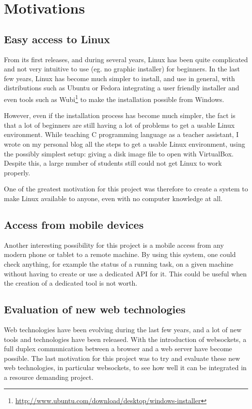 \section{Motivations}
\subsection{Easy access to Linux}
From its first releases, and during several years, Linux has been quite 
complicated and not very intuitive to use (eg. no graphic installer) for beginners.
In the last few years, Linux has become much simpler to install, and use in general, 
with distributions such as Ubuntu or Fedora integrating a user friendly installer 
and even tools such as Wubi\footnote{\url{http://www.ubuntu.com/download/desktop/windows-installer}}
to make the installation possible from Windows.

However, even if the installation process has become much simpler, the fact is that 
a lot of beginners are still having a lot of problems to get a usable Linux environment. 
While teaching C programming language as a teacher assistant, I wrote 
on my personal blog all the steps to get a usable Linux environment, using the 
possibly simplest setup: giving a disk image file to open with VirtualBox. 
Despite this, a large number of students still could not get Linux to work properly.

One of the greatest motivation for this project was therefore to create a system to 
make Linux available to anyone, even with no computer knowledge at all.
%
\subsection{Access from mobile devices}
Another interesting possibility for this project is a mobile access from any modern 
phone or tablet to a remote machine. By using this system, one could check anything,
for example the status of a running task,  on a given machine without having 
to create or use a dedicated API for it. This could be useful when the creation of 
a dedicated tool is not worth.
%
\subsection{Evaluation of new web technologies }
Web technologies have been evolving during the last few years, and a lot 
of new tools and technologies have been released. With the introduction of
websockets, a full duplex communication between a browser and a web server 
have become possible. 
The last motivation for this project was to try and evaluate these new web 
technologies, in particular websockets, to see how well it can be integrated 
in a resource demanding project.

